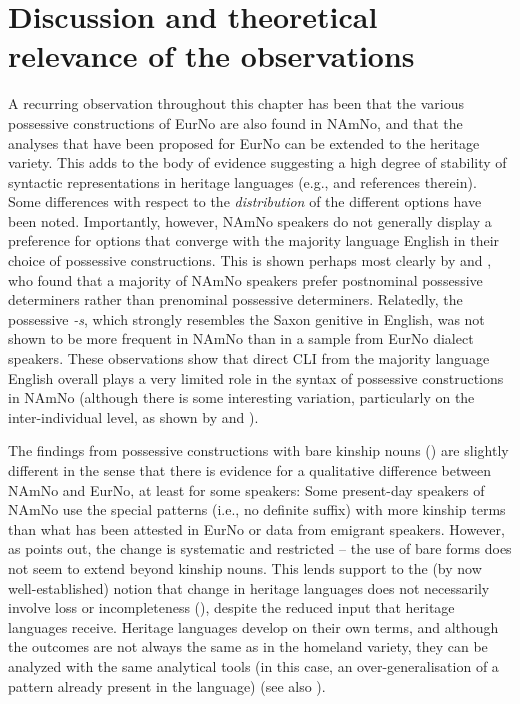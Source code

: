 \documentclass[output=paper,colorlinks,citecolor=brown]{langscibook}
\begin{document}
\section{Discussion and theoretical relevance of the observations}\label{sec:theoreticalrelevance}
A recurring observation throughout this chapter has been that the various possessive constructions of EurNo are also found in NAmNo, and that the analyses that have been proposed for EurNo can be extended to the heritage variety. This adds to the body of evidence suggesting a high degree of stability of syntactic representations in heritage languages (e.g., \citealt{benmamounetal2013hls, polinsky2018heritage, lohndaletal2019hlacquisition} and references therein). Some differences with respect to the \emph{distribution} of the different options have been noted. Importantly, however, NAmNo speakers do not generally display a preference for options that converge with the majority language English in their choice of possessive constructions. This is shown perhaps most clearly by \citet{anderssenetal2018cross-linguistic} and \citet{eidehjelde2023input}, who found that a majority of NAmNo speakers prefer postnominal possessive determiners rather than prenominal possessive determiners. Relatedly, the possessive \emph{-s}, which strongly resembles the Saxon genitive in English, was not shown to be more frequent in  NAmNo than in a sample from EurNo dialect speakers. These observations show that direct CLI from the majority language English overall plays a very limited role in the syntax of possessive constructions in NAmNo (although there is some interesting variation, particularly on the inter-individual level, as shown by \citealt{anderssenetal2018cross-linguistic} and \citealt{eidehjelde2023input}).

The findings from possessive constructions with bare kinship nouns () are slightly different in the sense that there is evidence for a qualitative difference between NAmNo and EurNo, at least for some speakers: Some present-day speakers of NAmNo use the special patterns (i.e., no definite suffix) with more kinship terms than what has been attested  in EurNo or data from emigrant speakers. However, as \citet[212]{kinn2021split} points out, the change is systematic and restricted -- the use of bare forms does not seem to extend beyond kinship nouns. This lends support to the (by now well-established) notion that change in heritage languages does not necessarily involve loss or incompleteness (\citealt{hoppputnam2015restructuring, kupishrothman2016terminology, bayrametal2019terminology}), despite the reduced input that heritage languages receive. Heritage languages develop on their own terms, and although the outcomes are not always the same as in the homeland variety, they can be analyzed with the same analytical tools (in this case, an over-generalisation of a pattern already present in the language) (see also \citealt{kupischpolinsky2021fastforward}).
\end{document}
